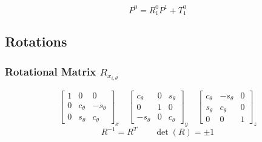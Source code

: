 \vspace{-0.5em}
$$
    P^0 = R_1^0 P^1 + T_1^0
$$
\subsection{Rotations}
    \subsubsection{Rotational Matrix \texorpdfstring{\hfill $R_{x_{i,\theta}}$}{}}
        \vspace{-1em}
        $$
        \begin{bmatrix}
            1 & 0 & 0\\
            0 & c_\theta &-s_\theta\\
            0 & s_\theta & c_\theta
        \end{bmatrix}_x
        \quad
        \begin{bmatrix}
            c_\theta &0 & s_\theta\\
            0 & 1 & 0\\
            -s_\theta & 0 & c_\theta
        \end{bmatrix}_y
        \quad
        \begin{bmatrix}
            c_\theta &-s_\theta& 0\\
            s_\theta & c_\theta& 0\\
            0 & 0 & 1
        \end{bmatrix}_z
        $$
        $$
            R^{-1} = R^T \qquad \det(R) = \pm 1
        $$
